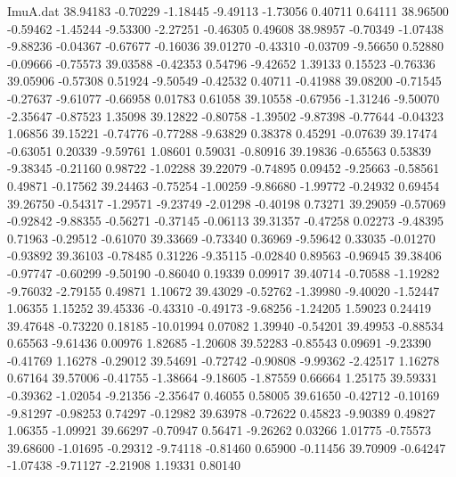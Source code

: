 \begin{filecontents}{ImuA.dat}
  38.94183   -0.70229   -1.18445   -9.49113   -1.73056    0.40711    0.64111
  38.96500   -0.59462   -1.45244   -9.53300   -2.27251   -0.46305    0.49608
  38.98957   -0.70349   -1.07438   -9.88236   -0.04367   -0.67677   -0.16036
  39.01270   -0.43310   -0.03709   -9.56650    0.52880   -0.09666   -0.75573
  39.03588   -0.42353    0.54796   -9.42652    1.39133    0.15523   -0.76336
  39.05906   -0.57308    0.51924   -9.50549   -0.42532    0.40711   -0.41988
  39.08200   -0.71545   -0.27637   -9.61077   -0.66958    0.01783    0.61058
  39.10558   -0.67956   -1.31246   -9.50070   -2.35647   -0.87523    1.35098
  39.12822   -0.80758   -1.39502   -9.87398   -0.77644   -0.04323    1.06856
  39.15221   -0.74776   -0.77288   -9.63829    0.38378    0.45291   -0.07639
  39.17474   -0.63051    0.20339   -9.59761    1.08601    0.59031   -0.80916
  39.19836   -0.65563    0.53839   -9.38345   -0.21160    0.98722   -1.02288
  39.22079   -0.74895    0.09452   -9.25663   -0.58561    0.49871   -0.17562
  39.24463   -0.75254   -1.00259   -9.86680   -1.99772   -0.24932    0.69454
  39.26750   -0.54317   -1.29571   -9.23749   -2.01298   -0.40198    0.73271
  39.29059   -0.57069   -0.92842   -9.88355   -0.56271   -0.37145   -0.06113
  39.31357   -0.47258    0.02273   -9.48395    0.71963   -0.29512   -0.61070
  39.33669   -0.73340    0.36969   -9.59642    0.33035   -0.01270   -0.93892
  39.36103   -0.78485    0.31226   -9.35115   -0.02840    0.89563   -0.96945
  39.38406   -0.97747   -0.60299   -9.50190   -0.86040    0.19339    0.09917
  39.40714   -0.70588   -1.19282   -9.76032   -2.79155    0.49871    1.10672
  39.43029   -0.52762   -1.39980   -9.40020   -1.52447    1.06355    1.15252
  39.45336   -0.43310   -0.49173   -9.68256   -1.24205    1.59023    0.24419
  39.47648   -0.73220    0.18185  -10.01994    0.07082    1.39940   -0.54201
  39.49953   -0.88534    0.65563   -9.61436    0.00976    1.82685   -1.20608
  39.52283   -0.85543    0.09691   -9.23390   -0.41769    1.16278   -0.29012
  39.54691   -0.72742   -0.90808   -9.99362   -2.42517    1.16278    0.67164
  39.57006   -0.41755   -1.38664   -9.18605   -1.87559    0.66664    1.25175
  39.59331   -0.39362   -1.02054   -9.21356   -2.35647    0.46055    0.58005
  39.61650   -0.42712   -0.10169   -9.81297   -0.98253    0.74297   -0.12982
  39.63978   -0.72622    0.45823   -9.90389    0.49827    1.06355   -1.09921
  39.66297   -0.70947    0.56471   -9.26262    0.03266    1.01775   -0.75573
  39.68600   -1.01695   -0.29312   -9.74118   -0.81460    0.65900   -0.11456
  39.70909   -0.64247   -1.07438   -9.71127   -2.21908    1.19331    0.80140

\end{filecontents}
